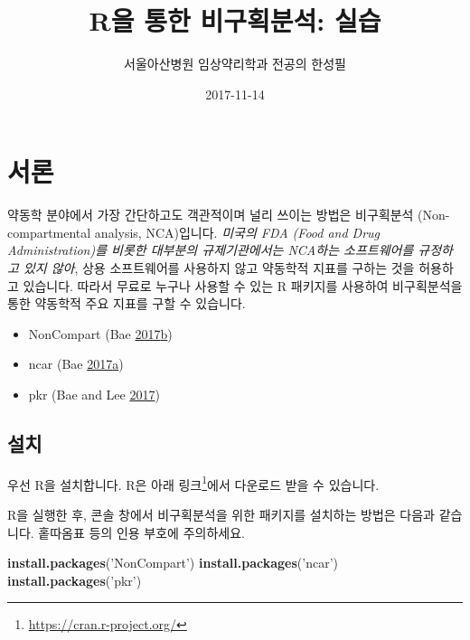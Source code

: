 \documentclass[12pt,]{krantz}
\title{R을 통한 비구획분석: 실습}
\author{서울아산병원 임상약리학과 전공의 한성필}
\date{2017-11-14}
\newenvironment{Shaded}{\begin{snugshade}}{\end{snugshade}}
\newcommand{\KeywordTok}[1]{\textcolor[rgb]{0.13,0.29,0.53}{\textbf{#1}}}
\newcommand{\StringTok}[1]{\textcolor[rgb]{0.31,0.60,0.02}{#1}}
\newcommand{\NormalTok}[1]{#1}
\providecommand{\tightlist}{%
  \setlength{\itemsep}{0pt}\setlength{\parskip}{0pt}}
\let\rmarkdownfootnote\footnote%
\def\footnote{\protect\rmarkdownfootnote}
\begin{document}
\maketitle

{
\hypersetup{linkcolor=black}
\setcounter{tocdepth}{2}
\tableofcontents
}
\mainmatter

\hypertarget{intro}{%
\chapter{서론}\label{intro}}

약동학 분야에서 가장 간단하고도 객관적이며 널리 쓰이는 방법은 비구획분석
(Non-compartmental analysis, NCA)입니다. \emph{미국의 FDA (Food and Drug
Administration)를 비롯한 대부분의 규제기관에서는 NCA하는 소프트웨어를
규정하고 있지 않아}, 상용 소프트웨어를 사용하지 않고 약동학적 지표를
구하는 것을 허용하고 있습니다. 따라서 무료로 누구나 사용할 수 있는 R
패키지를 사용하여 비구획분석을 통한 약동학적 주요 지표를 구할 수
있습니다.

\begin{itemize}
\tightlist
\item
  NonCompart (Bae
  \protect\hyperlink{ref-R-NonCompart}{2017}\protect\hyperlink{ref-R-NonCompart}{b})
\item
  ncar (Bae
  \protect\hyperlink{ref-R-ncar}{2017}\protect\hyperlink{ref-R-ncar}{a})
\item
  pkr (Bae and Lee \protect\hyperlink{ref-R-pkr}{2017})
\end{itemize}

\section{설치}

우선 R을 설치합니다. R은 아래 링크\footnote{\url{https://cran.r-project.org/}}에서
다운로드 받을 수 있습니다.

R을 실행한 후, 콘솔 창에서 비구획분석을 위한 패키지를 설치하는 방법은
다음과 같습니다. 홑따옴표 등의 인용 부호에 주의하세요.

\begin{Shaded}
\begin{Highlighting}[]
\KeywordTok{install.packages}\NormalTok{(}\StringTok{'NonCompart'}\NormalTok{)}
\KeywordTok{install.packages}\NormalTok{(}\StringTok{'ncar'}\NormalTok{)}
\KeywordTok{install.packages}\NormalTok{(}\StringTok{'pkr'}\NormalTok{)}
\end{Highlighting}
\end{Shaded}
\end{document}
